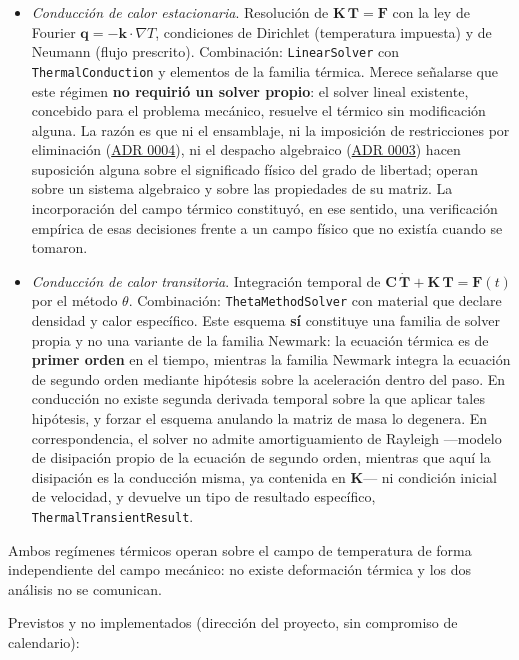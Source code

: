 \documentclass[11pt,oneside]{report}
\begin{document}
\begin{itemize}
  \item \textit{Conducción de calor estacionaria}. Resolución de $\mathbf K\,\mathbf T = \mathbf F$ con la ley de Fourier $\mathbf q = -\mathbf k\cdot\nabla T$, condiciones de Dirichlet (temperatura impuesta) y de Neumann (flujo prescrito). Combinación: \texttt{LinearSolver} con \texttt{ThermalConduction} y elementos de la familia térmica. Merece señalarse que este régimen \textbf{no requirió un solver propio}: el solver lineal existente, concebido para el problema mecánico, resuelve el térmico sin modificación alguna. La razón es que ni el ensamblaje, ni la imposición de restricciones por eliminación (\hyperref[adr:0004]{ADR 0004}), ni el despacho algebraico (\hyperref[adr:0003]{ADR 0003}) hacen suposición alguna sobre el significado físico del grado de libertad; operan sobre un sistema algebraico y sobre las propiedades de su matriz. La incorporación del campo térmico constituyó, en ese sentido, una verificación empírica de esas decisiones frente a un campo físico que no existía cuando se tomaron.
  \item \textit{Conducción de calor transitoria}. Integración temporal de $\mathbf C\,\dot{\mathbf T} + \mathbf K\,\mathbf T = \mathbf F(t)$ por el método $\theta$. Combinación: \texttt{ThetaMethodSolver} con material que declare densidad y calor específico. Este esquema \textbf{sí} constituye una familia de solver propia y no una variante de la familia Newmark: la ecuación térmica es de \textbf{primer orden} en el tiempo, mientras la familia Newmark integra la ecuación de segundo orden mediante hipótesis sobre la aceleración dentro del paso. En conducción no existe segunda derivada temporal sobre la que aplicar tales hipótesis, y forzar el esquema anulando la matriz de masa lo degenera. En correspondencia, el solver no admite amortiguamiento de Rayleigh ---modelo de disipación propio de la ecuación de segundo orden, mientras que aquí la disipación es la conducción misma, ya contenida en $\mathbf K$--- ni condición inicial de velocidad, y devuelve un tipo de resultado específico, \texttt{ThermalTransientResult}.
\end{itemize}

Ambos regímenes térmicos operan sobre el campo de temperatura de forma independiente del campo mecánico: no existe deformación térmica y los dos análisis no se comunican.

Previstos y no implementados (dirección del proyecto, sin compromiso de calendario):
\end{document}
